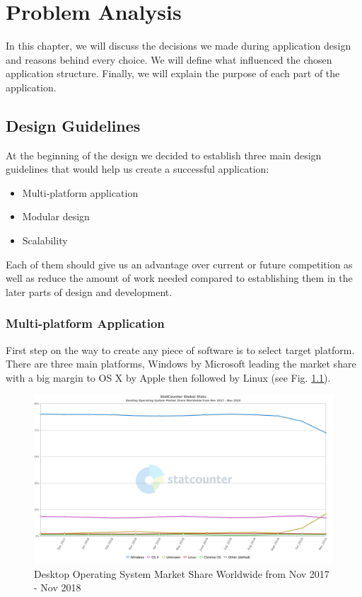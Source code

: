 \chapter{Problem Analysis}

In this chapter, we will discuss the decisions we made during application design and reasons behind every choice. We will define what influenced the chosen application structure. Finally, we will explain the purpose of each part of the application.

\section{Design Guidelines}
At the beginning of the design we decided to establish three main design guidelines that would help us create a successful application:
\begin{itemize}
    \item Multi-platform application
    \item Modular design
    \item Scalability
\end{itemize}
Each of them should give us an advantage over current or future competition as well as reduce the amount of work needed compared to establishing them in the later parts of design and development.

\subsection{Multi-platform Application}

First step on the way to create any piece of software is to select target platform. There are three main platforms, Windows by Microsoft leading the market share with a big margin to OS X by Apple then followed by Linux (see Fig. \ref{fig01:osMarketShareChart}).

\begin{figure}[ht]\centering
\includegraphics[width=1.0\textwidth]{img/StatCounter-os_combined-ww-monthly-201711-201811}
\caption{Desktop Operating System Market Share Worldwide from Nov 2017 - Nov 2018~\citep{osMarketShare}}
\label{fig01:osMarketShareChart}
\end{figure}

